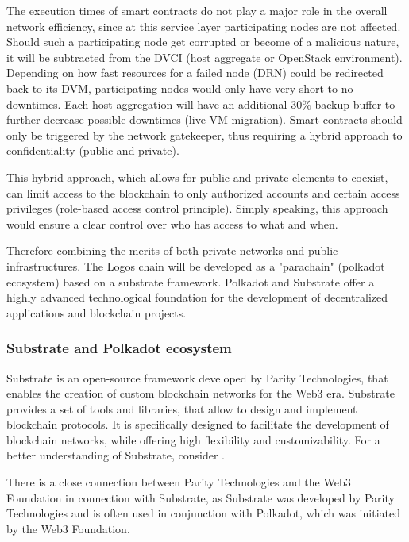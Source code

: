 \documentclass[]{article}
\begin{document}
The execution times of smart contracts do not play a major role in the overall network efficiency, since at this service layer participating nodes are not affected.
Should such a participating node get corrupted or become of a malicious nature, it will be subtracted from the DVCI (host aggregate or OpenStack environment).
Depending on how fast resources for a failed node (DRN) could be redirected back to its DVM, participating nodes would only have very short to no downtimes. 
Each host aggregation will have an additional 30\% backup buffer to further decrease possible downtimes (live VM-migration).
Smart contracts should only be triggered by the network gatekeeper, thus requiring a hybrid approach to confidentiality (public and private).

This hybrid approach, which allows for public and private elements to coexist, can limit access to the blockchain to only authorized accounts and certain access privileges (role-based access control principle).
Simply speaking, this approach would ensure a clear control over who has access to what and when.

Therefore combining the merits of both private networks and public infrastructures.
The Logos chain will be developed as a "parachain" (polkadot ecosystem) based on a substrate framework.
Polkadot and Substrate offer a highly advanced technological foundation for the development of decentralized applications and blockchain projects. 

\subsubsection{Substrate and Polkadot ecosystem}
Substrate is an open-source framework developed by Parity Technologies, that enables the creation of custom blockchain networks for the Web3 era.
Substrate provides a set of tools and libraries, that allow to design and implement blockchain protocols.
It is specifically designed to facilitate the development of blockchain networks, while offering high flexibility and customizability. 
For a better understanding of Substrate, consider \cite{SubstrateDoc}.

There is a close connection between Parity Technologies and the Web3 Foundation in connection with Substrate, as Substrate was developed by Parity Technologies and is often used in conjunction with 
Polkadot, which was initiated by the Web3 Foundation. 
\end{document}
